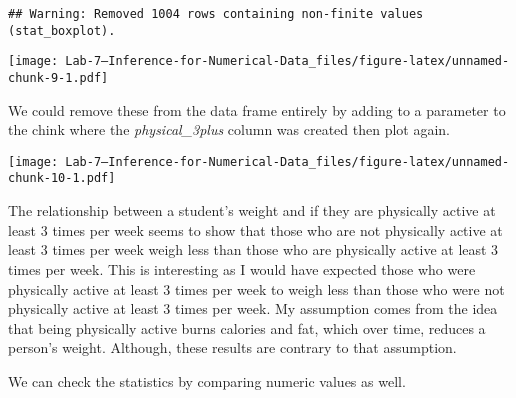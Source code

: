 \documentclass[
]{article}
\newenvironment{Shaded}{\begin{snugshade}}{\end{snugshade}}
\newcommand{\DataTypeTok}[1]{\textcolor[rgb]{0.13,0.29,0.53}{#1}}
\newcommand{\DecValTok}[1]{\textcolor[rgb]{0.00,0.00,0.81}{#1}}
\newcommand{\KeywordTok}[1]{\textcolor[rgb]{0.13,0.29,0.53}{\textbf{#1}}}
\newcommand{\NormalTok}[1]{#1}
\newcommand{\OperatorTok}[1]{\textcolor[rgb]{0.81,0.36,0.00}{\textbf{#1}}}
\newcommand{\OtherTok}[1]{\textcolor[rgb]{0.56,0.35,0.01}{#1}}
\newcommand{\StringTok}[1]{\textcolor[rgb]{0.31,0.60,0.02}{#1}}
\begin{document}
\begin{verbatim}
## Warning: Removed 1004 rows containing non-finite values (stat_boxplot).
\end{verbatim}

\texttt{[image: Lab-7---Inference-for-Numerical-Data\_files/figure-latex/unnamed-chunk-9-1.pdf]}

We could remove these from the data frame entirely by adding to a
parameter to the chink where the \emph{physical\_3plus} column was
created then plot again.

\begin{Shaded}
\end{Shaded}

\texttt{[image: Lab-7---Inference-for-Numerical-Data\_files/figure-latex/unnamed-chunk-10-1.pdf]}

The relationship between a student's weight and if they are physically
active at least 3 times per week seems to show that those who are not
physically active at least 3 times per week weigh less than those who
are physically active at least 3 times per week. This is interesting as
I would have expected those who were physically active at least 3 times
per week to weigh less than those who were not physically active at
least 3 times per week. My assumption comes from the idea that being
physically active burns calories and fat, which over time, reduces a
person's weight. Although, these results are contrary to that
assumption.

We can check the statistics by comparing numeric values as well.

\begin{Shaded}
\end{Shaded}
\end{document}
